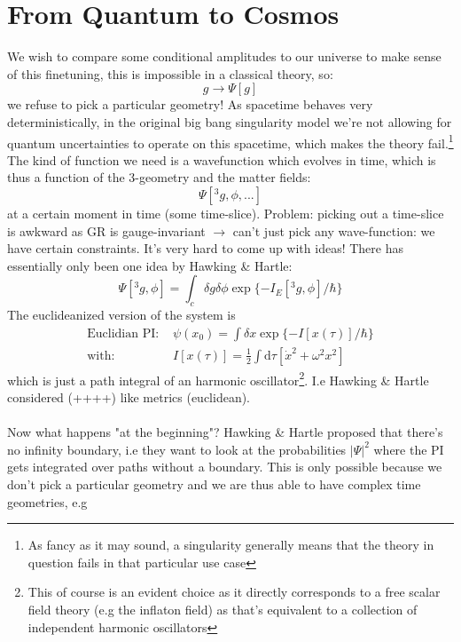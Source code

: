 \documentclass{article}
\begin{document}
  \section{From Quantum to Cosmos} 
We wish to compare some conditional amplitudes to our universe to make sense of this finetuning, this is impossible in a classical theory, so:
  \begin{equation}
    g \rightarrow \Psi[g]
  \end{equation}
  we refuse to pick a particular geometry! As spacetime behaves very deterministically, in the original big bang singularity model we're not allowing for quantum uncertainties to operate on this spacetime, which makes the theory fail.\footnote{As fancy as it may sound, a singularity generally means that the theory in question fails in that particular use case} 
  \vspace{0.2cm}
  The kind of function we need is a wavefunction which evolves in time, which is thus a function of the 3-geometry and the matter fields:
  \begin{equation}
    \Psi[^3g,\phi,...]
  \end{equation}
  at a certain moment in time (some time-slice). Problem: picking out a time-slice is awkward as GR is gauge-invariant $\rightarrow$ can't just pick any wave-function: we have certain constraints. 
  It's very hard to come up with ideas! There has essentially only been one idea by Hawking \& Hartle:
  \begin{equation}
    \Psi[^3g,\phi] = \int_c \delta g \delta \phi \exp\{-I_E[^3g,\phi]/\hbar\}
  \end{equation} 
  The euclideanized version of the system is
  \begin{eqnarray}
    \text{Euclidian PI: }&\psi(x_0) = \int\delta x \exp\{-I[x(\tau)]/\hbar\}\\
    \text{with: }& I[x(\tau)] = \frac{1}{2} \int\text{d}\tau [\dot{x}^2 + \omega^2x^2]
  \end{eqnarray} 
  which is just a path integral of an harmonic oscillator\footnote{This of course is an evident choice as it directly corresponds to a free scalar field theory (e.g the inflaton field) as that's equivalent to a collection of independent harmonic oscillators}. I.e Hawking \& Hartle considered (++++) like metrics (euclidean).\\\\
Now what happens "at the beginning"? Hawking \& Hartle proposed that there's no infinity boundary, i.e they want to look at the probabilities $|\Psi|^2$ where the PI gets integrated over paths without a boundary. This is only possible because we don't pick a particular geometry and we are thus able to have complex time geometries, e.g 
\end{document}
